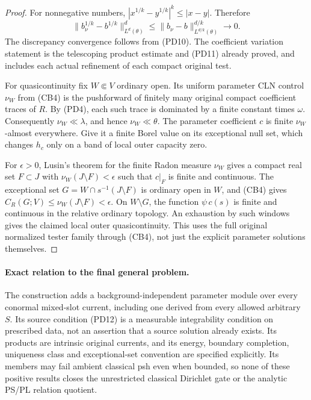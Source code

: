 \documentclass[11pt,a4paper]{article}
\numberwithin{equation}{section}
\theoremstyle{definition}
\theoremstyle{remark}
\begin{document}
\begin{proof}
For nonnegative numbers,
$|x^{1/k}-y^{1/k}|^k\leq|x-y|$. Therefore
\[
 \|b_\nu^{1/k}-b^{1/k}\|_{L^d(\theta)}^d
      \leq\|b_\nu-b\|_{L^{d/k}(\theta)}^{d/k}\longrightarrow0.
\]
The discrepancy convergence follows from (PD10).
The coefficient variation statement is the telescoping
product estimate and (PD11) already proved, and includes
each actual refinement of each compact original test.

For quasicontinuity fix $W\Subset V$ ordinary open.
Its uniform parameter CLN control $\nu_W$ from (CB4)
is the pushforward of finitely many original compact
coefficient traces of $R$. By (PD4), each such trace
is dominated by a finite constant times $\omega$.
Consequently $\nu_W\ll\lambda$, and hence
$\nu_W\ll\theta$. The parameter coefficient $c$ is
finite $\nu_W$-almost everywhere. Give it a finite
Borel value on its exceptional null set, which changes
$h_c$ only on a band of local outer capacity zero.

For $\epsilon>0$, Lusin's theorem for the finite Radon
measure $\nu_W$ gives a compact real set $F\subset J$
with $\nu_W(J\setminus F)<\epsilon$ such that
$c|_F$ is finite and continuous. The exceptional set
$G=W\cap s^{-1}(J\setminus F)$ is ordinary open in
$W$, and (CB4) gives
$C_R(G;V)\leq\nu_W(J\setminus F)<\epsilon$.
On $W\setminus G$, the function
$\psi\,c(s)$ is finite and continuous in the relative
ordinary topology. An exhaustion by such windows
gives the claimed local outer quasicontinuity.
This uses the full original normalized tester family
through (CB4), not just the explicit parameter
solutions themselves.
\end{proof}

\paragraph{Exact relation to the final general problem.}
The construction adds a background-independent parameter
module over every conormal mixed-slot current, including
one derived from every allowed arbitrary $S$. Its source
condition (PD12) is a measurable integrability condition
on prescribed data, not an assertion that a source
solution already exists. Its products are intrinsic
original currents, and its energy, boundary completion,
uniqueness class and exceptional-set convention are
specified explicitly. Its members may fail ambient
classical psh even when bounded, so none of these
positive results closes the unrestricted classical
Dirichlet gate or the analytic PS/PL relation quotient.
\end{document}
